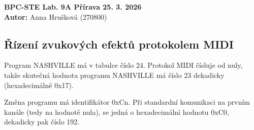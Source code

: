 \documentclass[12pt, a4paper]{article}
\begin{document}
\begin{center}
    {\large \textbf{BPC-STE Lab. 9A Přírava 25. 3. 2026}}\\[0.15cm]
    {\large \textbf{Autor:} Anna Hrušková (270800)}\\[0.15cm]
\end{center}
\vspace{0.4cm} %

\subsection*{Řízení zvukových efektů protokolem MIDI}

Program NASHVILLE má v tabulce číslo 24. Protokol MIDI čísluje od nuly, takže skutečná hodnota programu NASHVILLE má číslo 23 dekadicky (hexadecimálně 0x17).

Změna programu má identifikátor 0xCn. Při standardní komunikaci na prvním kanále (tedy na hodnotě nula), se jedná o hexadecimální hodnotu 0xC0, dekadicky pak číslo 192.


    
    





\printbibliography[title={Seznam použité literatury}]
\end{document}
